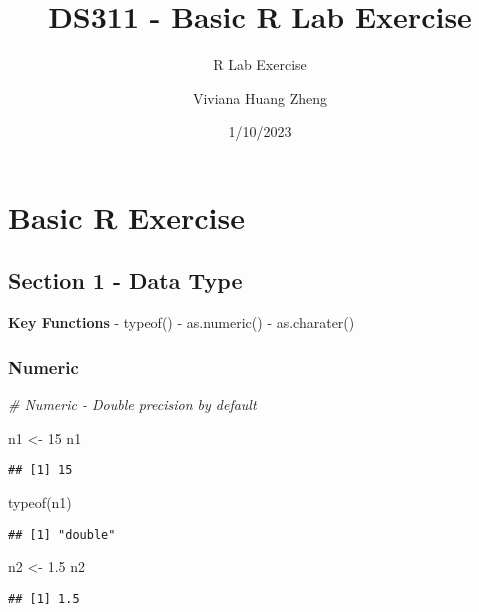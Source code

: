 \documentclass[
]{article}
\title{DS311 - Basic R Lab Exercise}
\subtitle{R Lab Exercise}
\author{Viviana Huang Zheng}
\date{1/10/2023}
\newenvironment{Shaded}{\begin{snugshade}}{\end{snugshade}}
\newcommand{\CommentTok}[1]{\textcolor[rgb]{0.56,0.35,0.01}{\textit{#1}}}
\newcommand{\DecValTok}[1]{\textcolor[rgb]{0.00,0.00,0.81}{#1}}
\newcommand{\FloatTok}[1]{\textcolor[rgb]{0.00,0.00,0.81}{#1}}
\newcommand{\FunctionTok}[1]{\textcolor[rgb]{0.00,0.00,0.00}{#1}}
\newcommand{\NormalTok}[1]{#1}
\newcommand{\OtherTok}[1]{\textcolor[rgb]{0.56,0.35,0.01}{#1}}
\begin{document}
\maketitle

\hypertarget{basic-r-exercise}{%
\section{Basic R Exercise}\label{basic-r-exercise}}

\hypertarget{section-1---data-type}{%
\subsection{Section 1 - Data Type}\label{section-1---data-type}}

\textbf{Key Functions} - typeof() - as.numeric() - as.charater()

\hypertarget{numeric}{%
\subsubsection{Numeric}\label{numeric}}

\begin{Shaded}
\begin{Highlighting}[]
\CommentTok{\# Numeric {-} Double precision by default}

\NormalTok{n1 }\OtherTok{\textless{}{-}} \DecValTok{15}  
\NormalTok{n1}
\end{Highlighting}
\end{Shaded}

\begin{verbatim}
## [1] 15
\end{verbatim}

\begin{Shaded}
\begin{Highlighting}[]
\FunctionTok{typeof}\NormalTok{(n1)}
\end{Highlighting}
\end{Shaded}

\begin{verbatim}
## [1] "double"
\end{verbatim}

\begin{Shaded}
\begin{Highlighting}[]
\NormalTok{n2 }\OtherTok{\textless{}{-}} \FloatTok{1.5}
\NormalTok{n2}
\end{Highlighting}
\end{Shaded}

\begin{verbatim}
## [1] 1.5
\end{verbatim}
\end{document}
